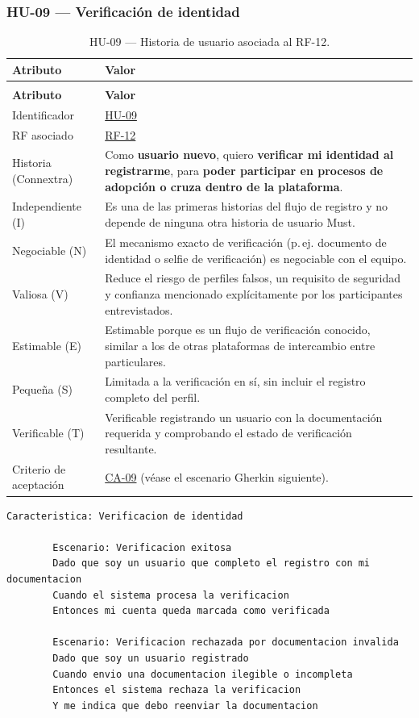 \documentclass[journal,onecolumn]{IEEEtran}
\makeatletter
\newenvironment{atributos}[2]{%
	\small
	\begin{longtable}{@{}>{\raggedright\arraybackslash}p{4.2cm} >{\raggedright\arraybackslash}p{11.2cm}@{}}
		\caption{#2}\label{tab:#1}\\
		\toprule
		\textbf{Atributo} & \textbf{Valor} \\
		\midrule
		\endfirsthead
		\multicolumn{2}{@{}l}{\small\itshape (continuación)}\\
		\toprule
		\textbf{Atributo} & \textbf{Valor} \\
		\midrule
		\endhead
		\bottomrule
		\endlastfoot
	}{%
	\end{longtable}
	\normalsize
}
\makeatother
\begin{document}
	\subsubsection{HU-09 --- Verificación de identidad}
	
	\begin{atributos}{HU-09}{HU-09 --- Historia de usuario asociada al RF-12.}
		Identificador & \hyperref[tab:HU-09]{HU-09} \\
		RF asociado & \hyperref[tab:RF-12]{RF-12} \\
		Historia (Connextra) & Como \textbf{usuario nuevo}, quiero \textbf{verificar mi identidad al registrarme}, para \textbf{poder participar en procesos de adopción o cruza dentro de la plataforma}. \\
		Independiente (I) & Es una de las primeras historias del flujo de registro y no depende de ninguna otra historia de usuario Must. \\
		Negociable (N) & El mecanismo exacto de verificación (p.\,ej. documento de identidad o selfie de verificación) es negociable con el equipo. \\
		Valiosa (V) & Reduce el riesgo de perfiles falsos, un requisito de seguridad y confianza mencionado explícitamente por los participantes entrevistados. \\
		Estimable (E) & Estimable porque es un flujo de verificación conocido, similar a los de otras plataformas de intercambio entre particulares. \\
		Pequeña (S) & Limitada a la verificación en sí, sin incluir el registro completo del perfil. \\
		Verificable (T) & Verificable registrando un usuario con la documentación requerida y comprobando el estado de verificación resultante. \\
		Criterio de aceptación & \hyperref[lst:ca09]{CA-09} (véase el escenario Gherkin siguiente). \\
	\end{atributos}
	
	\begin{lstlisting}[style=gherkin,caption={CA-09 --- Escenario de aceptación de la historia HU-09.},label={lst:ca09}]
		Caracteristica: Verificacion de identidad
		
		Escenario: Verificacion exitosa
		Dado que soy un usuario que completo el registro con mi documentacion
		Cuando el sistema procesa la verificacion
		Entonces mi cuenta queda marcada como verificada
		
		Escenario: Verificacion rechazada por documentacion invalida
		Dado que soy un usuario registrado
		Cuando envio una documentacion ilegible o incompleta
		Entonces el sistema rechaza la verificacion
		Y me indica que debo reenviar la documentacion
	\end{lstlisting}
	
\end{document}
